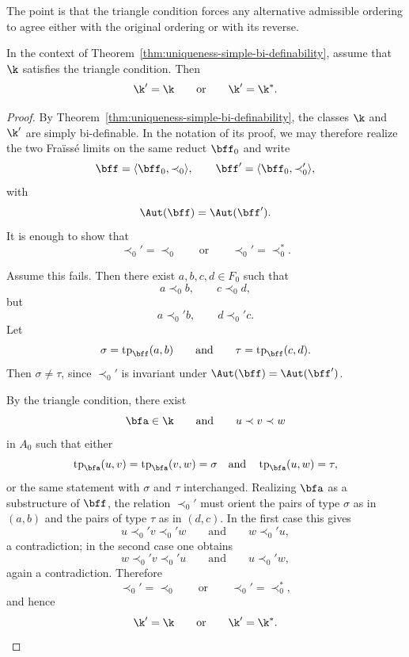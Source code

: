The point is that the triangle condition forces any alternative admissible ordering to agree either with the original ordering or with its reverse.

\begin{corollary}
    \label{cor:triangle-condition}
    In the context of Theorem~\ref{thm:uniqueness-simple-bi-definability}, assume that $\k$ satisfies the triangle condition. Then
    \[
        \k'=\k
        \qquad\text{or}\qquad
        \k'=\k^*.
    \]
\end{corollary}

\begin{proof}
    By Theorem~\ref{thm:uniqueness-simple-bi-definability}, the classes $\k$
    and $\k'$ are simply bi-definable. In the notation of its proof, we may
    therefore realize the two Fra\"iss\'e limits on the same reduct \(\bff_0\)
    and write
    \[
        \bff=\langle \bff_0,\prec_0\rangle,
        \qquad
        \bff'=\langle \bff_0,\prec_0'\rangle,
    \]
    with
    \[
        \Aut(\bff)=\Aut(\bff').
    \]
    It is enough to show that
    \[
        \prec_0'=\prec_0
        \qquad\text{or}\qquad
        \prec_0'=\prec_0^*.
    \]

    Assume this fails. Then there exist \(a,b,c,d\in F_0\)
    such that
    \[
        a\prec_0 b,\qquad c\prec_0 d,
    \]
    but
    \[
        a\prec_0' b,\qquad d\prec_0' c.
    \]
    Let
    \[
        \sigma=\operatorname{tp}_{\bff}(a,b)
        \qquad\text{and}\qquad
        \tau=\operatorname{tp}_{\bff}(c,d).
    \]
    Then \(\sigma\neq \tau\),
    since $\prec_0'$ is invariant under $\Aut(\bff)=\Aut(\bff')$.

    By the triangle condition, there exist
    \[
        \bfa\in\k
        \qquad\text{and}\qquad
        u\prec v\prec w
    \]
    in $A_0$ such that either
    \[
        \operatorname{tp}_{\bfa}(u,v)=\operatorname{tp}_{\bfa}(v,w)=\sigma
        \quad\text{and}\quad
        \operatorname{tp}_{\bfa}(u,w)=\tau,
    \]
    or the same statement with $\sigma$ and $\tau$ interchanged. Realizing $\bfa$ as a substructure of $\bff$, the relation $\prec_0'$ must orient the pairs of type $\sigma$ as in $(a,b)$ and the pairs of type $\tau$ as in $(d,c)$. In the first case this gives
    \[
        u\prec_0' v\prec_0' w
        \qquad\text{and}\qquad
        w\prec_0' u,
    \]
    a contradiction; in the second case one obtains
    \[
        w\prec_0' v\prec_0' u
        \qquad\text{and}\qquad
        u\prec_0' w,
    \]
    again a contradiction. Therefore
    \[
        \prec_0'=\prec_0
        \qquad\text{or}\qquad
        \prec_0'=\prec_0^*,
    \]
    and hence
    \[
        \k'=\k
        \qquad\text{or}\qquad
        \k'=\k^*.
    \]
\end{proof}

